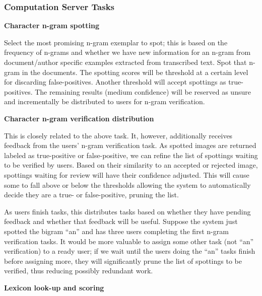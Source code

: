 \documentclass[ms]{byuprop}
\begin{document}
\subsubsection{Computation Server Tasks}

{\setlength{\parindent}{0cm}
\textbf{Character n-gram spotting}

\begin{addmargin}[3em]{3em}
Select the most promising n-gram exemplar to spot; this is based on the frequency of n-grams and whether we have new information for an n-gram from document/author specific examples extracted from transcribed text. Spot that n-gram in the documents. The spotting scores will be threshold at a certain level for discarding false-positives. Another threshold will accept spottings as true-positives. The remaining results (medium confidence) will be reserved as unsure and incrementally be distributed to users for n-gram verification.
\\[.5cm]
\end{addmargin}

\textbf{Character n-gram verification distribution}

\begin{addmargin}[3em]{3em}
This is closely related to the above task. It, however, additionally receives feedback from the users' n-gram verification task. As spotted images are returned labeled as true-positive or false-positive, we can refine the list of spottings waiting to be verified by users. Based on their similarity to an accepted or rejected image, spottings waiting for review will have their confidence adjusted. This will cause some to fall above or below the thresholds allowing the system to automatically decide they are a true- or false-positive, pruning the list.

As users finish tasks, this distributes tasks based on whether they have pending feedback and whether that feedback will be useful. Suppose the system just spotted the bigram ``an'' and has three users completing the first n-gram verification tasks. It would be more valuable to assign some other task (not ``an'' verification) to a ready user; if we wait until the users doing the ``an'' tasks finish before assigning more, they will significantly prune the list of spottings to be verified, thus reducing possibly redundant work.
\\[.5cm]
\end{addmargin}

\textbf{Lexicon look-up and scoring}

}
\end{document}
